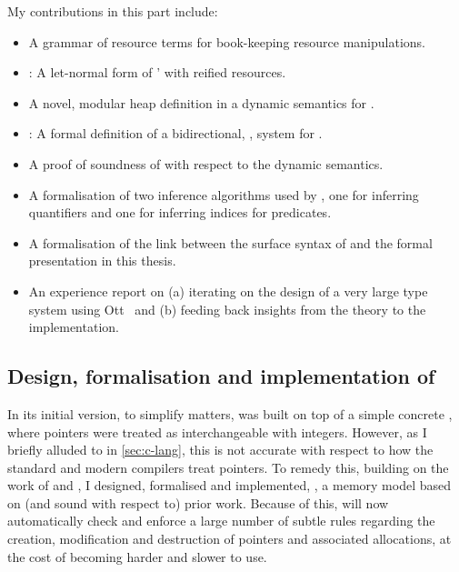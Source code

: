 My contributions in this part include:
\begin{itemize}
    \item A grammar of resource terms for book-keeping resource manipulations.
    \item {}: A let-normal form of '  with
        reified resources.
    \item A novel, modular heap definition in a dynamic semantics for .
    \item {}: A formal definition of a bidirectional,
        ,  system for .
    \item A proof of soundness of  with respect to the
         dynamic semantics.
    \item A formalisation of two inference algorithms used by , one for inferring
        quantifiers and one for inferring indices for  predicates.
    \item A formalisation of the link between the surface syntax of  and
        the formal presentation in this thesis.
    \item An experience report on (a) iterating on the design of a very large type
        system using Ott~ and (b) feeding back insights
        from the theory to the implementation.
\end{itemize}

\subsection{Design, formalisation and implementation of }

In its initial version, to simplify matters,  was built on top of a
simple concrete , where pointers were treated as
interchangeable with integers. However, as I briefly alluded to in
\cref{sec:c-lang}, this is not accurate with respect to how the standard and
modern compilers treat pointers. To remedy this, building on the work of
 and , I
designed, formalised and implemented, , a memory model based on
(and sound with respect to) prior work. Because of this,  will now
automatically check and enforce a large number of subtle rules regarding the
creation, modification and destruction of pointers and associated allocations,
at the cost of  becoming harder and slower to use.


